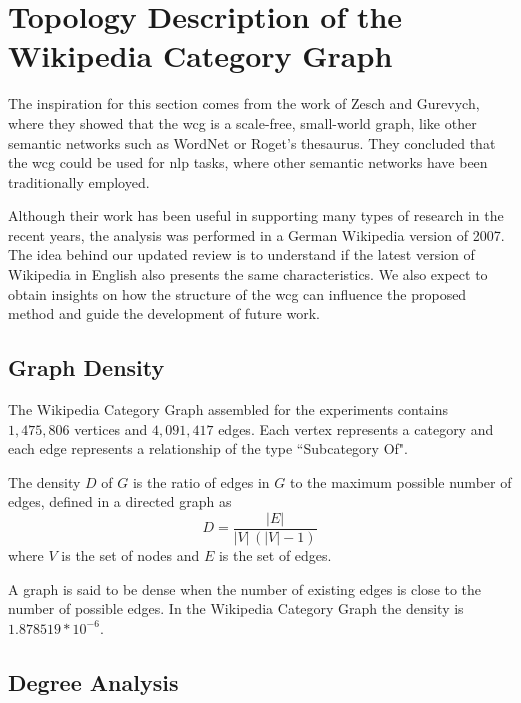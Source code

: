 \chapter{\hspace*{3pt} Topology Description of the Wikipedia Category Graph}
\label{chapter:graph}

The inspiration for this section comes from the work of Zesch and Gurevych\cite{zesch2007analysis}, where they showed that the \gls{wcg} is a scale-free, small-world graph, like other semantic networks such as WordNet or Roget’s thesaurus. They concluded that the \gls{wcg} could be used for \gls{nlp} tasks, where other semantic networks have been traditionally employed\cite{zesch2007analysis}.

Although their work has been useful in supporting many types of research in the recent years, the analysis was performed in a German Wikipedia version of 2007. The idea behind our updated review is to understand if the latest version of Wikipedia in English also presents the same characteristics. We also expect to obtain insights on how the structure of the \gls{wcg} can influence the proposed method and guide the development of future work. 



\section{\hspace*{3pt} Graph Density}

The Wikipedia Category Graph assembled for the experiments contains $1,475,806$ vertices and $4,091,417$ edges. Each vertex represents a category and each edge represents a relationship of the type ``Subcategory Of". 


The density $D$ of $G$ is the ratio of edges in $G$ to the maximum possible number of edges, defined in a directed graph as  
\begin{equation}
D={\frac  {|E|}{|V|\,(|V|-1)}}
\end{equation} where $V$ is the set of nodes and $E$ is the set of edges.

A graph is said to be dense when the number of existing edges is close to the number of possible edges. In the Wikipedia Category Graph the density is $1.878519 * 10^{-6}$.


\section{\hspace*{3pt} Degree Analysis}


